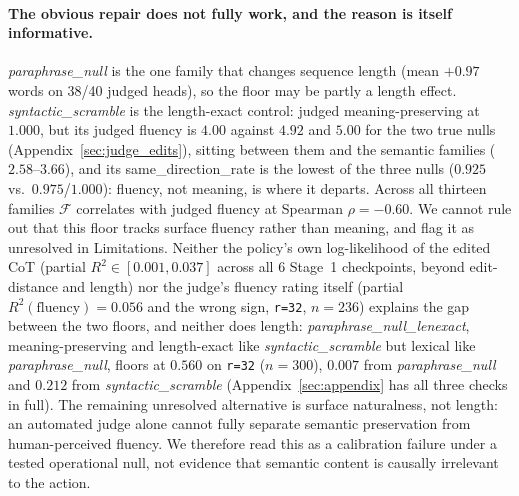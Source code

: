 \documentclass{article}
\begin{document}
\paragraph{The obvious repair does not fully work, and the reason is itself informative.} \emph{paraphrase\_null} is the one family that changes sequence length (mean $+0.97$ words on 38/40 judged heads), so the floor may be partly a length effect. \emph{syntactic\_scramble} is the length-exact control: judged meaning-preserving at $1.000$, but its judged fluency is $4.00$ against $4.92$ and $5.00$ for the two true nulls (Appendix~\ref{sec:judge_edits}), sitting between them and the semantic families ($2.58$--$3.66$), and its same\_direction\_rate is the lowest of the three nulls ($0.925$ vs.\ $0.975$/$1.000$): fluency, not meaning, is where it departs. Across all thirteen families $\mathcal{F}$ correlates with judged fluency at Spearman $\rho = -0.60$. We cannot rule out that this floor tracks surface fluency rather than meaning, and flag it as unresolved in Limitations. Neither the policy's own log-likelihood of the edited CoT (partial $R^2 \in [0.001, 0.037]$ across all 6 Stage~1 checkpoints, beyond edit-distance and length) nor the judge's fluency rating itself (partial $R^2(\text{fluency}) = 0.056$ and the wrong sign, \texttt{r=32}, $n{=}236$) explains the gap between the two floors, and neither does length: \emph{paraphrase\_null\_lenexact}, meaning-preserving and length-exact like \emph{syntactic\_scramble} but lexical like \emph{paraphrase\_null}, floors at $\mathbf{0.560}$ on \texttt{r=32} ($n{=}300$), $0.007$ from \emph{paraphrase\_null} and $0.212$ from \emph{syntactic\_scramble} (Appendix~\ref{sec:appendix} has all three checks in full). The remaining unresolved alternative is surface naturalness, not length: an automated judge alone cannot fully separate semantic preservation from human-perceived fluency. We therefore read this as a calibration failure under a tested operational null, not evidence that semantic content is causally irrelevant to the action.
\end{document}
